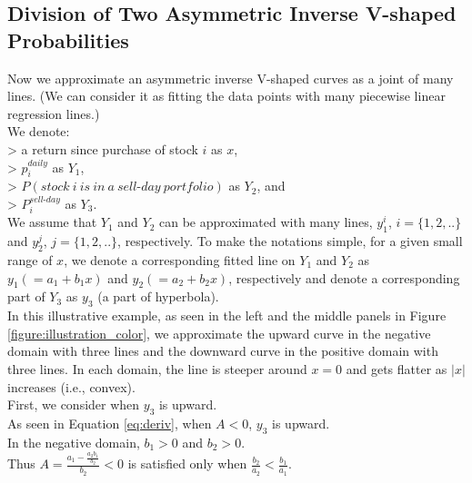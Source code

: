 \documentclass[11pt, a4paper]{article}
\begin{document}
\subsection{Division of Two Asymmetric Inverse V-shaped Probabilities}
\label{section:division_two_inverse_v}

Now we approximate an asymmetric inverse V-shaped curves as a joint of many lines. (We can consider it as fitting the data points with many piecewise linear regression lines.)\\

\noindent
We denote:\\
> a return since purchase of stock $i$ as $x$, \\
> $p^{daily}_{i}$ as $Y_1$,\\
> $P(stock~i~is~in~a~sell\mbox{-}day~portfolio)$ as $Y_2$, and \\
> $P^{sell\mbox{-}day}_{i}$ as $Y_3$.\\

\noindent
We assume that $Y_1$ and $Y_2$ can be approximated with many lines, $y^i_1$, $i=\{1,2,..\}$ and $y^j_2$, $j=\{1,2,..\}$, respectively.
To make the notations simple, for a given small range of $x$, we denote a corresponding fitted line on $Y_1$ and $Y_2$ as $y_1(=a_1+b_1x)$ and $y_2(=a_2+b_2x)$, respectively and denote a corresponding part of $Y_3$ as $y_3$ (a part of hyperbola).\\


\noindent
In this illustrative example, as seen in the left and the middle panels in Figure \ref{figure:illustration_color}, we approximate the upward curve in the negative domain with three lines and the downward curve in the positive domain with three lines. In each domain, the line is steeper around $x=0$ and gets flatter as $|x|$ increases (i.e., convex).\\

\noindent
First, we consider when $y_3$ is upward.\\ 
As seen in Equation \ref{eq:deriv}, when $A<0$, $y_3$ is upward.\\

\noindent
In the negative domain, $b_1>0$ and $b_2>0$.\\
Thus $A = \frac{a_1-\frac{a_2 b_1}{b_2}}{b_2}<0$ is satisfied only when  $\frac{b_2}{a_2} < \frac{b_1}{a_1}$.\\
\end{document}
